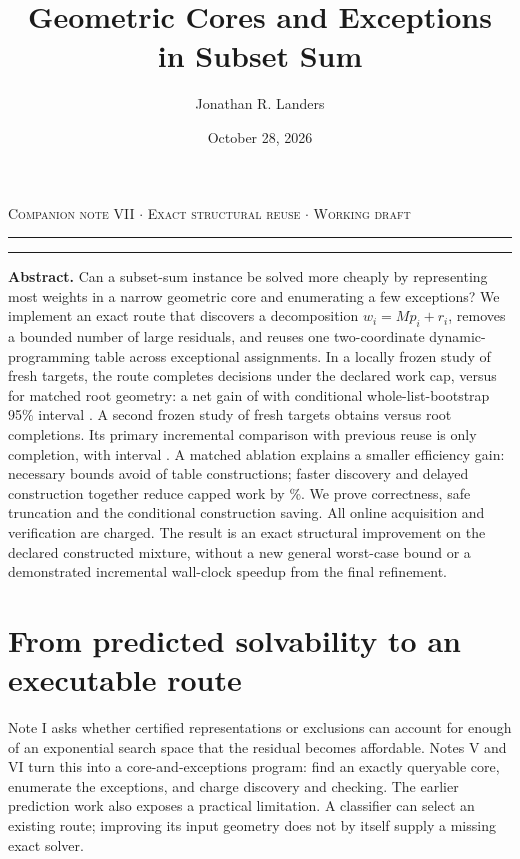 \documentclass[10pt,english]{article}
\title{\sffamily\bfseries Geometric Cores and Exceptions\\in Subset Sum}
\author{Jonathan R. Landers}
\date{October 28, 2026}
\begin{document}
\maketitle
\vspace{-1em}
\noindent\textcolor{paperaccent}{\footnotesize\textsc{Companion note VII $\cdot$ Exact structural reuse $\cdot$ Working draft}}
\par\noindent\textcolor{paperaccent}{\rule{.11\linewidth}{1.5pt}}\textcolor{paperline}{\rule{.89\linewidth}{.45pt}}
\vspace{.5em}

\begin{tcolorbox}[accentbox]
\textbf{Abstract.} Can a subset-sum instance be solved more cheaply by representing most weights in a narrow geometric core and enumerating a few exceptions? We implement an exact route that discovers a decomposition $w_i=Mp_i+r_i$, removes a bounded number of large residuals, and reuses one two-coordinate dynamic-programming table across exceptional assignments. In a locally frozen study of \SevenFirstCases{} fresh targets, the route completes \SevenFirstReuse{} decisions under the declared work cap, versus \SevenFirstRoot{} for matched root geometry: a net gain of \SevenFirstGain{} with conditional whole-list-bootstrap 95\% interval \SevenFirstInterval. A second frozen study of \SevenSecondCases{} fresh targets obtains \SevenSecondBounds{} versus \SevenSecondRoot{} root completions. Its primary incremental comparison with previous reuse is only \SevenIncrement{} completion, with interval \SevenIncrementInterval. A matched ablation explains a smaller efficiency gain: necessary bounds avoid \SevenAvoided{} of \SevenEagerBuilds{} table constructions; faster discovery and delayed construction together reduce capped work by \SevenWorkPercent\%. We prove correctness, safe truncation and the conditional construction saving. All online acquisition and verification are charged. The result is an exact structural improvement on the declared constructed mixture, without a new general worst-case bound or a demonstrated incremental wall-clock speedup from the final refinement.
\end{tcolorbox}

\section{From predicted solvability to an executable route}
Note I asks whether certified representations or exclusions can account for enough of an exponential search space that the residual becomes affordable. Notes V and VI turn this into a core-and-exceptions program: find an exactly queryable core, enumerate the exceptions, and charge discovery and checking. The earlier prediction work also exposes a practical limitation. A classifier can select an existing route; improving its input geometry does not by itself supply a missing exact solver.
\end{document}
